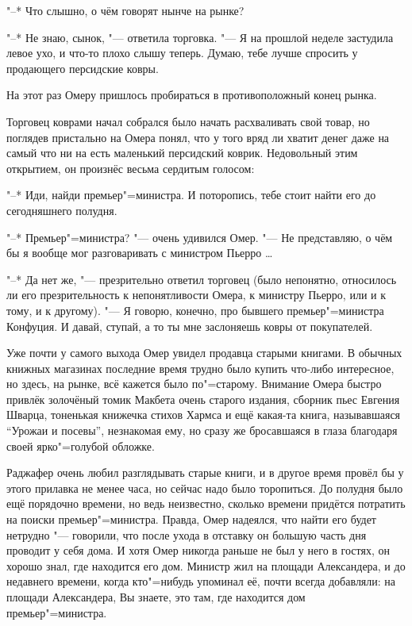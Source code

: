 "--* Что слышно, о чём говорят нынче на рынке?

"--* Не знаю, сынок, "--- ответила торговка.
"--- Я на прошлой неделе застудила левое ухо, и что-то плохо слышу теперь.
Думаю, тебе лучше спросить у продающего персидские ковры.

На этот раз Омеру пришлось пробираться в противоположный конец рынка.

Торговец коврами начал собрался было начать расхваливать свой товар, но поглядев
пристально на Омера понял, что у того вряд ли хватит денег даже на самый что ни
на есть маленький персидский коврик.
Недовольный этим открытием, он произнёс весьма сердитым голосом:

"--* Иди, найди премьер"=министра.
И поторопись, тебе стоит найти его до сегодняшнего полудня.

"--* Премьер"=министра? "--- очень удивился Омер.
"--- Не представляю, о чём бы я вообще мог разговаривать с министром
Пьерро \ldots

"--* Да нет же, "--- презрительно ответил торговец (было непонятно, относилось
ли его презрительность к непонятливости Омера, к министру Пьерро, или и к тому,
и к другому).
"--- Я говорю, конечно, про бывшего премьер"=министра Конфуция.
И давай, ступай, а то ты мне заслоняешь ковры от покупателей.

Уже почти у самого выхода Омер увидел продавца старыми книгами.
В обычных книжных магазинах последние время трудно было купить что-либо
интересное, но здесь, на рынке, всё кажется было по"=старому.
Внимание Омера быстро привлёк золочёный томик Макбета очень старого издания,
сборник пьес Евгения Шварца, тоненькая книжечка стихов Хармса и ещё какая-та
книга, называвшаяся \enquote{Урожаи и посевы}, незнакомая ему, но сразу же
бросавшаяся в глаза благодаря своей ярко"=голубой обложке.

Раджафер очень любил разглядывать старые книги, и в другое время провёл бы у
этого прилавка не менее часа, но сейчас надо было торопиться.
До полудня было ещё порядочно времени, но ведь неизвестно, сколько времени
придётся потратить на поиски премьер"=министра.
Правда, Омер надеялся, что найти его будет нетрудно "--- говорили, что после
ухода в отставку он большую часть дня проводит у себя дома.
И хотя Омер никогда раньше не был у него в гостях, он хорошо знал, где находится
его дом.
Министр жил на площади Александера, и до недавнего времени, когда кто"=нибудь
упоминал её, почти всегда добавляли: на площади Александера, Вы знаете, это там,
где находится дом премьер"=министра.

